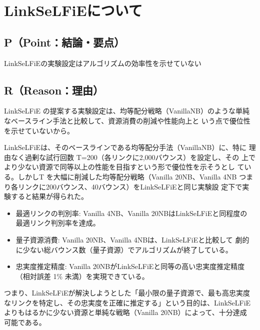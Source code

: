 \documentclass[technicalreport,dvipdfmx]{ieicej}
\begin{document}

\maketitle


\section{LinkSeLFiEについて}
\label{sec:org2ac77e7}
\subsection{P（Point：結論・要点）}
\label{sec:org0fe1955}
LinkSeLFiEの実験設定はアルゴリズムの効率性を示せていない

\subsection{R（Reason：理由）}
\label{sec:orge193be7}
LinkSeLFiE の提案する実験設定は、均等配分戦略（VanillaNB）のような単純
なベースライン手法と比較して、資源消費の削減や性能向上と
いう点で優位性を示せていないから。

LinkSeLFiEは、そのベースラインである均等配分手法（VanillaNB）に、特に
理由なく過剰な試行回数 T=200（各リンクに2,000バウンス）を設定し、その
上でより少ない資源で同等以上の性能を目指すという形で優位性を示そうとし
ている。しかしT を大幅に削減した均等配分戦略（Vanilla 20NB、Vanilla
4NB つまり各リンクに200バウンス、40バウンス）をLinkSeLFiEと同じ実験設
定下で実験すると結果が得られた。

\begin{itemize}
\item 最適リンクの判別率: Vanilla 4NB、Vanilla 20NBはLinkSeLFiEと同程度の
最適リンク判別率を達成。

\item 量子資源消費: Vanilla 20NB、Vanilla 4NBは、LinkSeLFiEと比較して
劇的に少ない総バウンス数（量子資源）でアルゴリズムが終了している。

\item 忠実度推定精度: Vanilla 20NBがLinkSeLFiEと同等の高い忠実度推定精度
（相対誤差 1\% 未満）を実現できている。
\end{itemize}

つまり、LinkSeLFiEが解決しようとした「最小限の量子資源で、最も高忠実度
なリンクを特定し、その忠実度を正確に推定する」という目的は、LinkSeLFiE
よりもはるかに少ない資源と単純な戦略（Vanilla 20NB）によって、十分達成
可能である。
\end{document}

